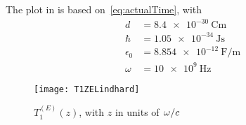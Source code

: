 \documentclass[11pt]{article}
\begin{document}
	The plot in  is based on~\eqref{eq:actualTime}, with
	\begin{align}
		d &= \SI{8.4e-30}{\coulomb \meter} \\
		\hbar &= \SI{1.05e-34}{\J \s} \\
		\epsilon_0 &= \SI{8.854e-12}{\farad\per\meter} \\
		\omega &= \SI{10e9}{\Hz}
	\end{align}
	\begin{figure}[htp]
		\centering
		\texttt{[image: T1ZELindhard]}
		\caption{$T_{1}^{(E)}(z)$, with $z$ in units of $\flatfrac{\omega}{c}$} \label{fig:t1ez}
	\end{figure}

	\newpage
	\listoftodos
	\newpage
	\printbibliography
\end{document}
